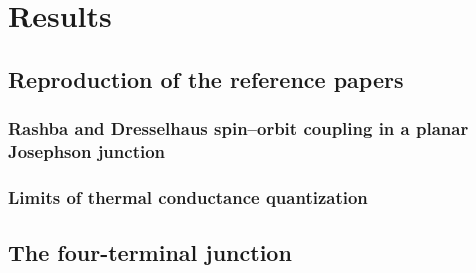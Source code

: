 \chapter{Results}
\label{ch:results}


\section{Reproduction of the reference papers}
\label{sec:reproduction}

\subsection{Rashba and Dresselhaus spin--orbit coupling in a planar Josephson junction}
\label{sec:repro_scharf}

\subsection{Limits of thermal conductance quantization}
\label{sec:repro_gresta}

\section{The four-terminal junction}
\label{sec:setup}

